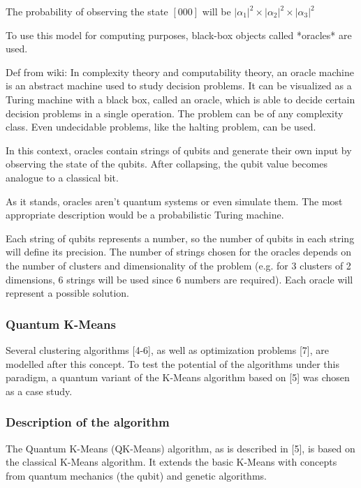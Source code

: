 The probability of observing the state $[000]$ will be $|\alpha_1|^2 \times |\alpha_2|^2 \times |\alpha_3|^2$

To use this model for computing purposes, black-box objects called *oracles* are used.


Def from wiki: In complexity theory and computability theory, an oracle machine is an abstract machine used to study decision problems. It can be visualized as a Turing machine with a black box, called an oracle, which is able to decide certain decision problems in a single operation. The problem can be of any complexity class. Even undecidable problems, like the halting problem, can be used. %

In this context, oracles contain strings of qubits and generate their own input by observing the state of the qubits. After collapsing, the qubit value becomes analogue to a classical bit.

As it stands, oracles aren't quantum systems or even simulate them. The most appropriate description would be a probabilistic Turing machine.

Each string of qubits represents a number, so the number of qubits in each string will define its precision. The number of strings chosen for the oracles depends on the number of clusters and dimensionality of the problem (e.g. for 3 clusters of 2 dimensions, 6 strings will be used since 6 numbers are required). Each oracle will represent a possible solution.


\subsubsection{Quantum K-Means}

Several clustering algorithms [4-6], as well as optimization problems [7], are modelled after this concept. To test the potential of the algorithms under this paradigm, a quantum variant of the K-Means algorithm based on [5] was chosen as a case study.

\subsubsection{Description of the algorithm}

The Quantum K-Means (QK-Means) algorithm, as is described in [5], is based on the classical K-Means algorithm. It extends the basic K-Means with concepts from quantum mechanics (the qubit) and genetic algorithms.

